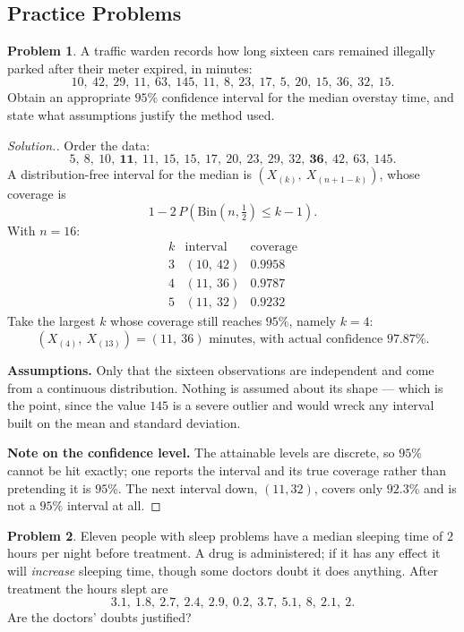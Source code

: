 \documentclass[11pt,a4paper]{article}
\theoremstyle{definition}
\newtheorem{problemx}{Problem}[section]
\newenvironment{problem}{\begin{problemx}}{\end{problemx}}
\newenvironment{solution}
  {\renewcommand{\qedsymbol}{}\begin{proof}[\textit{Solution}.]}
  {\end{proof}}
\begin{document}
\subsection{Practice Problems}

\begin{problem}
A traffic warden records how long sixteen cars remained illegally parked after
their meter expired, in minutes:
$$10,\ 42,\ 29,\ 11,\ 63,\ 145,\ 11,\ 8,\ 23,\ 17,\ 5,\ 20,\ 15,\ 36,\ 32,\ 15 .$$
Obtain an appropriate $95\%$ confidence interval for the median overstay time, and
state what assumptions justify the method used.
\end{problem}

\begin{solution}
Order the data:
$$5,\ 8,\ 10,\ \mathbf{11},\ 11,\ 15,\ 15,\ 17,\ 20,\ 23,\ 29,\ 32,\ \mathbf{36},\ 42,\ 63,\ 145 .$$
A distribution-free interval for the median is
$\left(X_{(k)},\ X_{(n+1-k)}\right)$, whose coverage is
$$1 - 2\,P\!\left(\text{Bin}\!\left(n,\tfrac12\right) \leq k-1\right).$$
With $n = 16$:
$$\begin{array}{c|c|c}
k & \text{interval} & \text{coverage}\\\hline
3 & (10,\ 42) & 0.9958\\
4 & (11,\ 36) & 0.9787\\
5 & (11,\ 32) & 0.9232
\end{array}$$
Take the largest $k$ whose coverage still reaches $95\%$, namely $k = 4$:
$$\boxed{\left(X_{(4)},\ X_{(13)}\right) = (11,\ 36) \text{ minutes, with actual
confidence } 97.87\% .}$$

\textbf{Assumptions.} Only that the sixteen observations are independent and come
from a continuous distribution. Nothing is assumed about its shape --- which is the
point, since the value $145$ is a severe outlier and would wreck any interval built
on the mean and standard deviation.

\textbf{Note on the confidence level.} The attainable levels are discrete, so
$95\%$ cannot be hit exactly; one reports the interval and its true coverage
rather than pretending it is $95\%$. The next interval down, $(11,32)$, covers only
$92.3\%$ and is not a $95\%$ interval at all.
\end{solution}

\begin{problem}
Eleven people with sleep problems have a median sleeping time of $2$ hours per
night before treatment. A drug is administered; if it has any effect it will
\emph{increase} sleeping time, though some doctors doubt it does anything. After
treatment the hours slept are
$$3.1,\ 1.8,\ 2.7,\ 2.4,\ 2.9,\ 0.2,\ 3.7,\ 5.1,\ 8,\ 2.1,\ 2 .$$
Are the doctors' doubts justified?
\end{problem}
\end{document}
